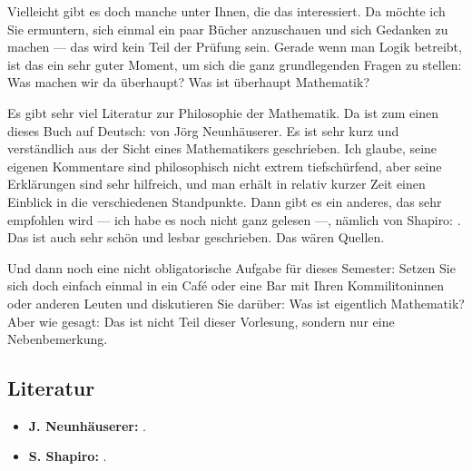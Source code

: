 \begin{spoken-clean}[00:28:30 - 00:30:30]
Vielleicht gibt es doch manche unter Ihnen, die das interessiert. Da möchte ich Sie ermuntern, sich einmal ein paar Bücher anzuschauen und sich Gedanken zu machen --- das wird kein Teil der Prüfung sein. Gerade wenn man Logik betreibt, ist das ein sehr guter Moment, um sich die ganz grundlegenden Fragen zu stellen: Was machen wir da überhaupt? Was ist überhaupt Mathematik?

Es gibt sehr viel Literatur zur Philosophie der Mathematik. Da ist zum einen dieses Buch auf Deutsch:  von Jörg Neunhäuserer. Es ist sehr kurz und verständlich aus der Sicht eines Mathematikers geschrieben. Ich glaube, seine eigenen Kommentare sind philosophisch nicht extrem tiefschürfend, aber seine Erklärungen sind sehr hilfreich, und man erhält in relativ kurzer Zeit einen Einblick in die verschiedenen Standpunkte. Dann gibt es ein anderes, das sehr empfohlen wird --- ich habe es noch nicht ganz gelesen ---, nämlich von Shapiro: . Das ist auch sehr schön und lesbar geschrieben. Das wären Quellen.

Und dann noch eine nicht obligatorische Aufgabe für dieses Semester: Setzen Sie sich doch einfach einmal in ein Café oder eine Bar mit Ihren Kommilitoninnen oder anderen Leuten und diskutieren Sie darüber: Was ist eigentlich Mathematik? Aber wie gesagt: Das ist nicht Teil dieser Vorlesung, sondern nur eine Nebenbemerkung.
\end{spoken-clean}

\subsection{Literatur}
\begin{math-stroke}
\begin{itemize}
    \item \textbf{J. Neunhäuserer:} .
    \item \textbf{S. Shapiro:} .
\end{itemize}
\end{math-stroke}

